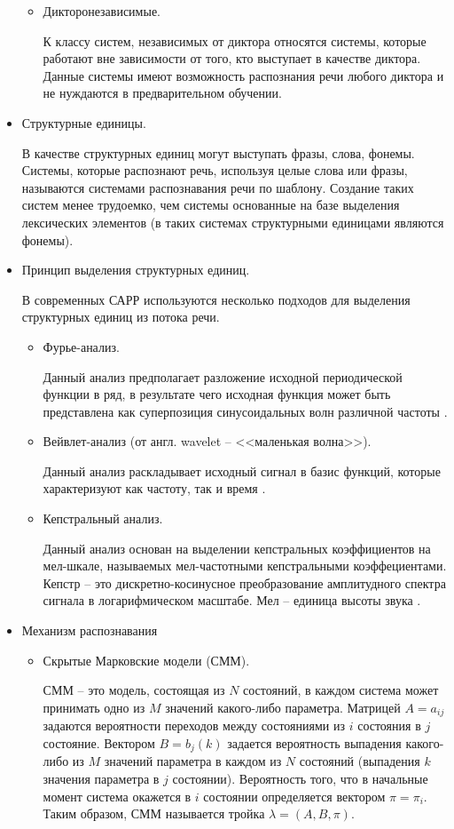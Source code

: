 \begin{itemize}
\begin{itemize}
		\item Дикторонезависимые.
		
		К классу систем, независимых от диктора относятся системы, которые 	работают вне зависимости от того, кто выступает в качестве диктора. Данные системы имеют возможность распознания речи любого диктора и не нуждаются в предварительном обучении.
		
	\end{itemize}
	\item Структурные единицы. 
	
	В качестве структурных единиц могут выступать фразы, слова, фонемы. Системы, которые распознают речь, используя целые слова или фразы, называются системами распознавания речи по шаблону. Создание таких систем менее трудоемко, чем системы основанные на базе выделения лексических элементов (в таких системах структурными единицами являются фонемы). 
	
	\item Принцип выделения структурных единиц.
	
	В современных САРР используются несколько подходов для выделения структурных единиц из потока речи. 
	\begin{itemize}
		\item Фурье-анализ. 
		
		Данный анализ предполагает разложение исходной периодической функции в ряд, в результате чего исходная функция может быть представлена как суперпозиция синусоидальных волн различной частоты \cite{fur_veivlet}.
		\item Вейвлет-анализ (от англ. wavelet -- <<маленькая волна>>). 
		
		Данный анализ раскладывает исходный сигнал в базис функций, которые характеризуют как частоту, так и время \cite{fur_veivlet}.
		\item Кепстральный анализ. 
		
		Данный анализ основан на выделении кепстральных коэффициентов на мел-шкале, называемых мел-частотными кепстральными коэффециентами. Кепстр -- это дискретно-косинусное преобразование амплитудного спектра сигнала в логарифмическом масштабе. Мел -- единица высоты звука \cite{kepstr}.
	\end{itemize}
	
	\item Механизм распознавания
	\begin{itemize}
		\item Скрытые Марковские модели (СММ).
		
		СММ -- это модель, состоящая из $N$ состояний, в каждом система может принимать одно из $M$ значений какого-либо параметра. Матрицей $A = a_{ij}$ задаются вероятности переходов между состояниями из $i$ состояния в $j$ состояние. Вектором $B = {b_j (k)}$ задается вероятность выпадения какого-либо из $M$ значений параметра в каждом из $N$ состояний (выпадения $k$ значения параметра в $j$ состоянии). Вероятность того, что в начальные момент система окажется в $i$ состоянии определяется вектором $\pi = {\pi_i}$. Таким образом, СММ называется тройка $\lambda = ({A, B, \pi})$.  
		

\end{itemize}
\end{itemize}
